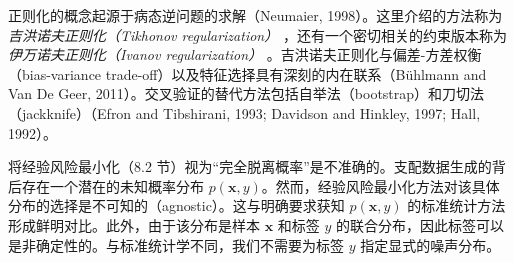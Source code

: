 正则化的概念起源于病态逆问题的求解（Neumaier, 1998）。这里介绍的方法称为 \emph{吉洪诺夫正则化（Tikhonov regularization）} ，还有一个密切相关的约束版本称为 \emph{伊万诺夫正则化（Ivanov regularization）} 。吉洪诺夫正则化与偏差-方差权衡（bias-variance trade-off）以及特征选择具有深刻的内在联系（Bühlmann and Van De Geer, 2011）。交叉验证的替代方法包括自举法（bootstrap）和刀切法（jackknife）（Efron and Tibshirani, 1993; Davidson and Hinkley, 1997; Hall, 1992）。

将经验风险最小化（8.2 节）视为“完全脱离概率”是不准确的。支配数据生成的背后存在一个潜在的未知概率分布 $ p(\boldsymbol{x}, y) $。然而，经验风险最小化方法对该具体分布的选择是不可知的（agnostic）。这与明确要求获知 $ p(\boldsymbol{x}, y) $ 的标准统计方法形成鲜明对比。此外，由于该分布是样本 $ \boldsymbol{x} $ 和标签 $ y $ 的联合分布，因此标签可以是非确定性的。与标准统计学不同，我们不需要为标签 $ y $ 指定显式的噪声分布。
